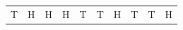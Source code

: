 {\begin{center}
\begin{xtabular*}{\mytablewidth}[t]{|p{10\mystarwidth}|p{10\mystarwidth}|p{10\mystarwidth}|p{10\mystarwidth}|p{10\mystarwidth}|p{10\mystarwidth}|p{10\mystarwidth}|p{10\mystarwidth}|p{10\mystarwidth}|p{10\mystarwidth}|}
    
        T &
    
    
        H &
    
    
        H &
    
    
        H &
    
    
        T &
    
    
        T &
    
    
        H &
    
    
        T &
    
    
        T &
    
    
        H%
     \tabularnewline{}
    

\end{xtabular*}
\end{center}}
